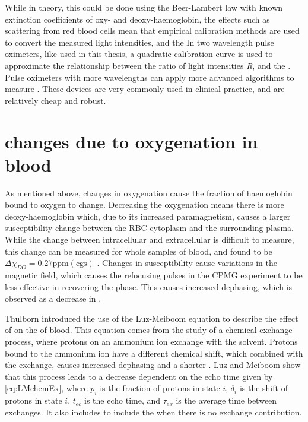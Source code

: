 While in theory, this could be done using the Beer-Lambert law with known extinction coefficients of oxy- and deoxy-haemoglobin, the effects such as scattering from red blood cells mean that empirical calibration methods are used to convert the measured light intensities, and the \SOtwo \cite{WiebenLightAbsorbancePulse1997}
In two wavelength pulse oximeters, like used in this thesis, a quadratic calibration curve is used to approximate the relationship between the ratio of light intensities \textit{R}, and the \SOtwo.
Pulse oximeters with more wavelengths can apply more advanced algorithms to measure \SOtwo.
These devices are very commonly used in clinical practice, and are relatively cheap and robust.

\section{\Ttwo changes due to oxygenation in blood}
\label{sec:back-T2SO2}
As mentioned above, changes in oxygenation cause the fraction of haemoglobin bound to oxygen to change.
Decreasing the oxygenation means there is more deoxy-haemoglobin which, due to its increased paramagnetism, causes a larger susceptibility change between the RBC cytoplasm and the surrounding plasma.
While the change between intracellular and extracellular is difficult to measure, this change can be measured for whole samples of blood, and found to be $\Delta\chi_{DO} = 0.27 \mathrm{ppm  (cgs)}$ \cite{JainInvestigatingmagneticsusceptibility2012}.
Changes in susceptibility cause variations in the magnetic field, which causes the refocusing pulses in the CPMG experiment to be less effective in recovering the phase.
This causes increased dephasing, which is observed as a decrease in \Ttwo.

Thulborn introduced the use of the Luz-Meiboom equation to describe the effect of \SOtwo on the \Ttwo of blood.
This equation comes from the study of a chemical exchange process, where protons on an ammonium ion exchange with the solvent\cite{LuzNuclearMagneticResonance1963}.
Protons bound to the ammonium ion have a different chemical shift, which combined with the exchange, causes increased dephasing and a shorter \Ttwo.
Luz and Meiboom show that this process leads to a \Ttwo decrease dependent on the echo time given by \autoref{eq:LMchemEx}\cite{LuzNuclearMagneticResonance1963}, where $p_i$ is the fraction of protons in state $i$, $\delta_i$ is the shift of protons in state $i$, $t_{ec}$ is the echo time, and $\tau_{ex}$ is the average time between exchanges. It also includes \TtwoO to include the \Ttwo when there is no exchange contribution.

